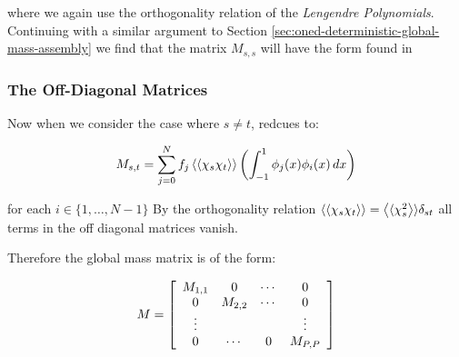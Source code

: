 where we again use the orthogonality relation of the \textit{Lengendre
Polynomials}. Continuing with a similar argument to Section
\ref{sec:oned-deterministic-global-mass-assembly} we find that the matrix
$M_{s,s}$ will have the form found in 

\subsubsection{The Off-Diagonal Matrices}

Now when we consider the case where $s \neq t$,
 redcues to:

\begin{equation}
    M_{s,t} = \sum_{j=0}^Nf_j\left\langle\langle\chi_s\chi_t\right\rangle\rangle\left(
        \int_{-1}^1\phi_j(x)\phi_i(x)\, dx
    \right)
\end{equation}

for each $i \in \{1,\ldots,N - 1\}$ By the orthogonality relation
$\left\langle\langle\chi_s\chi_t\right\rangle\rangle = \left\langle\langle\chi_s^2\right\rangle\rangle\delta_{st}$ all terms in the off
diagonal matrices vanish.

Therefore the global mass matrix is of the form:

\begin{equation}
    M = \left[\begin{array}{c c c c}
            M_{1,1} & 0 & \cdots & 0 \\
            0 & M_{2,2} & \cdots & 0 \\
            \vdots & & & \vdots \\
            0 & \cdots & 0 & M_{P,P}
    \end{array}\right]
\end{equation}
